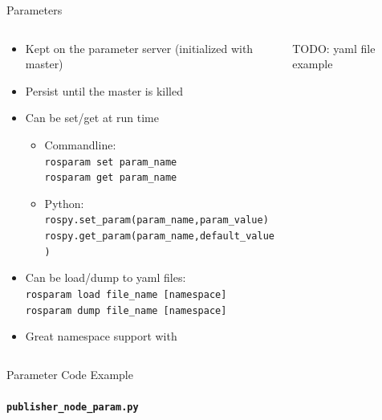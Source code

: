 \documentclass{beamer}
\newcommand{\pyinline}[1]{\texttt{#1}}
\newcommand{\inline}[1]{\texttt{#1}}
\begin{document}
\begin{frame}{Parameters}
	\begin{columns}
		\begin{column}{0.6\textwidth}
			\begin{itemize}
				\item Kept on the parameter server (initialized with master)
				\item Persist until the master is killed
				\item Can be set/get at run time
					\begin{itemize}
						\item Commandline:\\\inline{rosparam set param_name}\\\inline{rosparam get param_name}
						\item Python:\\\pyinline{rospy.set_param(param_name,param_value)}\\\pyinline{rospy.get_param(param_name,default_value)}
					\end{itemize}
				\item Can be load/dump to yaml files:\\\inline{rosparam load file_name [namespace]}\\\inline{rosparam dump file_name [namespace]}
				\item Great namespace support with \inline{~}
			\end{itemize}
		\end{column}
		\begin{column}{0.4\textwidth}
			TODO: yaml file example
		\end{column}
	\end{columns}
\end{frame}

\begin{frame}{Parameter Code Example}
	\framesubtitle{\texttt{publisher\_node\_param.py}}
	\inputminted{python}{snippet/publisher_node_param.py}
\end{frame}
\end{document}
